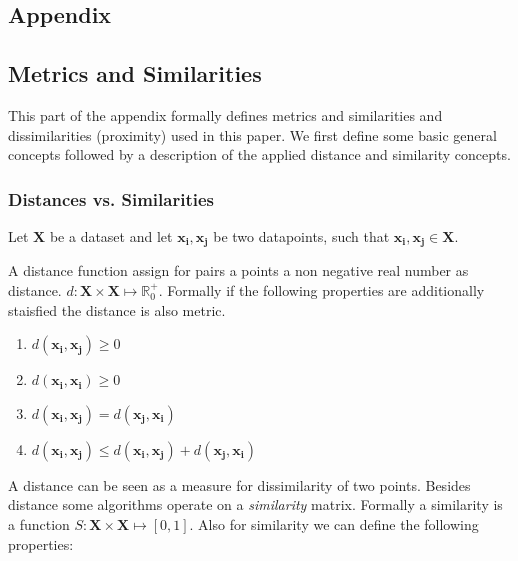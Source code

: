 \documentclass[12pt,a4paper,bibliography=totocnumbered,listof=totocnumbered]{scrartcl}
\begin{document}
\begin{appendix}
	
\section*{Appendix}
{}

\subsection*{Metrics and Similarities}

This part of the appendix formally defines metrics and similarities and dissimilarities (proximity) used in this paper. We first define some basic general concepts followed by a description of the applied distance and similarity concepts. 

\subsubsection*{Distances vs. Similarities}

Let $\boldsymbol{X}$ be a dataset and let $\boldsymbol{x_i},\boldsymbol{x_j}$ be two datapoints, such that $\boldsymbol{x_i},\boldsymbol{x_j} \in \boldsymbol{X}$. 

A distance function assign for pairs a points a non negative real number as distance. $d:\boldsymbol{X}\times \boldsymbol{X} \mapsto \mathbb{R}_0^+$. Formally if the following properties are additionally staisfied the distance is also metric.

\begin{enumerate}
	\setlength{\itemsep}{-5pt}
	\item $d(\boldsymbol{x_i},\boldsymbol{x_j}) \ge 0$
	\item $d(\boldsymbol{x_i},\boldsymbol{x_i}) \ge 0$
	\item $d(\boldsymbol{x_i},\boldsymbol{x_j}) = d(\boldsymbol{x_j},\boldsymbol{x_i}) $
	\item $d(\boldsymbol{x_i},\boldsymbol{x_j}) \le d(\boldsymbol{x_i},\boldsymbol{x_j})+ d(\boldsymbol{x_j},\boldsymbol{x_i}) $
\end{enumerate}

A distance can be seen as a measure for dissimilarity of two points. Besides distance some algorithms operate on a \textit{similarity} matrix. Formally a similarity is a function  $ S : \boldsymbol{X} \times \boldsymbol{X} \mapsto [0,1] $. Also for similarity we can define the following properties:


\end{appendix}
\end{document}
